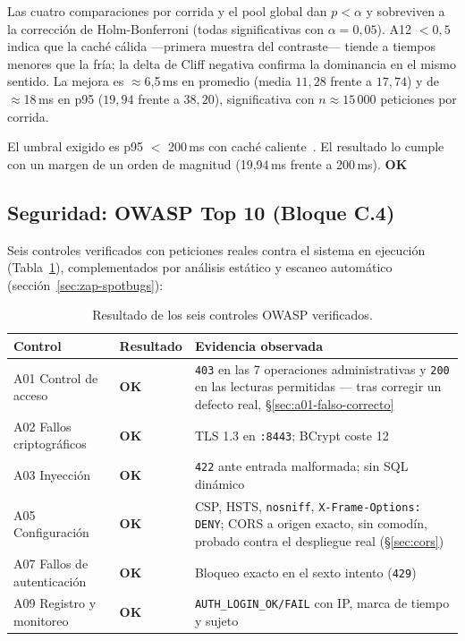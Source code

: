 \documentclass[11pt,a4paper]{article}
\newcommand{\ok}{\textcolor{okverde}{\textbf{OK}}}
\begin{document}
Las cuatro comparaciones por corrida y el pool global dan $p < \alpha$ y
sobreviven a la corrección de Holm-Bonferroni (todas significativas con
$\alpha = 0{,}05$). A12 $< 0{,}5$ indica que la caché cálida —primera
muestra del contraste— tiende a tiempos menores que la fría; la delta de
Cliff negativa confirma la dominancia en el mismo sentido. La mejora es
$\approx$6{,}5\,ms en promedio (media $11{,}28$ frente a $17{,}74$) y de
$\approx$18\,ms en p95 ($19{,}94$ frente a $38{,}20$), significativa con
$n \approx 15\,000$ peticiones por corrida.

El umbral exigido es p95 $<$ 200\,ms con caché caliente~\cite{iso25010}. El
resultado lo cumple con un margen de un orden de magnitud (19,94\,ms frente
a 200\,ms). \ok

\subsection{Seguridad: OWASP Top 10 (Bloque C.4)}

Seis controles verificados con peticiones reales contra el sistema en
ejecución~\cite{owasp2021} (Tabla~\ref{tab:owasp}), complementados por
análisis estático y escaneo automático (sección~\ref{sec:zap-spotbugs}):

\begin{table}[htbp]
\centering
\caption{Resultado de los seis controles OWASP verificados.}
\label{tab:owasp}
\begin{tabular}{@{}llp{7.6cm}@{}}
\toprule
\textbf{Control} & \textbf{Resultado} & \textbf{Evidencia observada} \\
\midrule
A01 Control de acceso & \ok & \texttt{403} en las 7 operaciones administrativas y \texttt{200} en las lecturas permitidas — tras corregir un defecto real, §\ref{sec:a01-falso-correcto} \\
A02 Fallos criptográficos & \ok & TLS 1.3 en \texttt{:8443}; BCrypt coste 12 \\
A03 Inyección & \ok & \texttt{422} ante entrada malformada; sin SQL dinámico \\
A05 Configuración & \ok & CSP, HSTS, \texttt{nosniff}, \texttt{X-Frame-Options: DENY}; CORS a origen exacto, sin comodín, probado contra el despliegue real (§\ref{sec:cors}) \\
A07 Fallos de autenticación & \ok & Bloqueo exacto en el sexto intento (\texttt{429}) \\
A09 Registro y monitoreo & \ok & \texttt{AUTH\_LOGIN\_OK/FAIL} con IP, marca de tiempo y sujeto \\
\bottomrule
\end{tabular}
\end{table}
\end{document}
